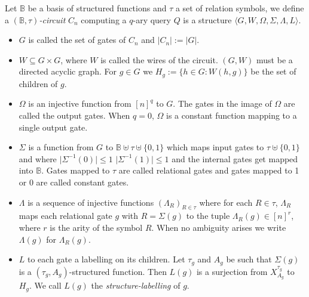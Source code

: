 \documentclass[../paper.tex]{subfiles}
\begin{document}


\begin{definition}
  Let $\mathbb{B}$ be a basis of structured functions and $\tau$ a set of
  relation symbols, we define a \emph{$(\mathbb{B}, \tau)$-circuit} $C_n$
  computing a $q$-ary query $Q$ is a structure $\langle G, W, \Omega, \Sigma,
  \Lambda, L\rangle$.
  \begin{itemize}
    \setlength\itemsep{0mm}
  \item $G$ is called the set of gates of $C_n$ and $\vert C_n \vert := \vert G
    \vert$.
  \item $W \subseteq G \times G$, where $W$ is called the wires of the circuit.
    $(G,W)$ must be a directed acyclic graph. For $g \in G$ we $H_g := \{ h \in
    G: W(h,g)\}$ be the set of children of $g$.
  \item $\Omega$ is an injective function from $[n]^q$ to $G$. The gates in the
    image of $\Omega$ are called the output gates. When $q = 0$, $\Omega$ is a
    constant function mapping to a single output gate.
  \item $\Sigma$ is a function from $G$ to $\mathbb{B} \uplus \tau \uplus
    \{0,1\} $ which maps input gates to $\tau \uplus \{0,1\}$ and where $\vert
    \Sigma^{-1} (0) \vert \leq 1$ $\vert \Sigma^{-1} (1) \vert \leq 1$ and the
    internal gates get mapped into $\mathbb{B}$. Gates mapped to $\tau$ are
    called relational gates and gates mapped to 1 or 0 are called constant
    gates.
  \item $\Lambda$ is a sequence of injective functions $(\Lambda_R)_{R \in
      \tau}$ where for each $R \in \tau$, $\Lambda_R$ maps each relational gate
    $g$ with $R = \Sigma (g)$ to the tuple $\Lambda_R (g) \in [n]^r$, where $r$
    is the arity of the symbol $R$. When no ambiguity arises we write $\Lambda
    (g)$ for $\Lambda_R (g)$.
  \item $L$ to each gate a labelling on its children. Let $\tau_g$ and $A_g$ be
    such that $\Sigma(g)$ is a $(\tau_g, A_g)$-structured function. Then $L(g)$
    is a surjection from $X^{\tau_g}_{A_g}$ to $H_g$. We call $L(g)$ the
    \emph{structure-labelling} of $g$.
  \end{itemize}
\end{definition}
\end{document}
